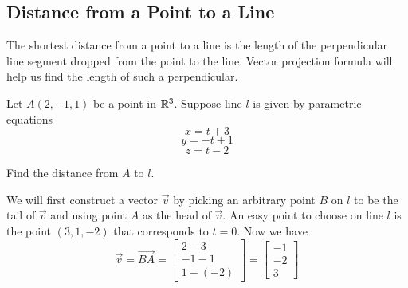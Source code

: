 \documentclass{ximera}
\begin{document}
    \subsection*{Distance from a Point to a Line}
     
    The shortest distance from a point to a line is the length of the perpendicular line segment dropped from the point to the line.  Vector projection formula will help us find the length of such a perpendicular.
     
    \begin{example}\label{ex:distancefrompttoline}
    Let $A(2, -1, 1)$ be a point in $\mathbb{R}^3$.  Suppose line $l$ is given by parametric equations $$x=t+3$$
    $$y=-t+1$$
    $$z=t-2$$
     
    \begin{center}
    \end{center}
     
    Find the distance from $A$ to $l$.
    \begin{explanation}
    We will first construct a vector $\vec{v}$ by picking an arbitrary point $B$ on $l$ to be the tail of $\vec{v}$ and using point $A$ as the head of $\vec{v}$.  An easy point to choose on line $l$ is the point $(3, 1, -2)$ that corresponds to $t=0$.  Now we have
    $$\vec{v}=\overrightarrow{BA}=\begin{bmatrix}2-3\\-1-1\\1-(-2)\end{bmatrix}=\begin{bmatrix}-1\\-2\\3\end{bmatrix}$$
     
    \begin{center}
    \end{center}
     

\end{explanation}
\end{example}
\end{document}
